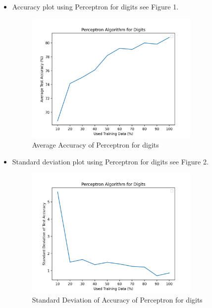 \documentclass{article}
\begin{document}
\begin{itemize}
    \item Accuracy plot using Perceptron for digits see Figure 1.
    \begin{figure}
        \centering
        \includegraphics[width=0.8\textwidth]{perDi.png}
        \caption{Average Accuracy of Perceptron for digits}
    \end{figure}
    
    \item Standard deviation plot using Perceptron for digits see Figure 2.
    \begin{figure}
        \centering
        \includegraphics[width=0.8\textwidth]{perDiSd.png}
        \caption{Standard Deviation of Accuracy of Perceptron for digits}
    \end{figure}
    

\end{itemize}
\end{document}

